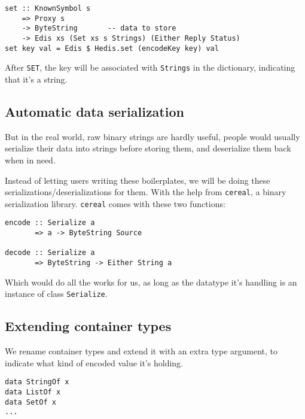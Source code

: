 \documentclass[pldi]{sigplanconf-pldi16}
\begin{document}
\begin{verbatim}
set :: KnownSymbol s
    => Proxy s
    -> ByteString       -- data to store
    -> Edis xs (Set xs s Strings) (Either Reply Status)
set key val = Edis $ Hedis.set (encodeKey key) val
\end{verbatim}

After \texttt{SET}, the key will be associated with
 \texttt{Strings} in the dictionary, indicating that it's a string.

\subsection{Automatic data serialization}
But in the real world, raw binary strings are hardly useful, people would
 usually serialize their data into strings before storing them, and deserialize
 them back when in need.

Instead of letting users writing these boilerplates, we will be doing these
 serializations/deserializations for them. With the help from
 \texttt{cereal}, a binary serialization library.
 \texttt{cereal} comes with these two functions:

\begin{verbatim}
encode :: Serialize a
       => a -> ByteString Source

decode :: Serialize a
       => ByteString -> Either String a
\end{verbatim}

Which would do all the works for us, as long as the datatype it's handling is
 an instance of class \texttt{Serialize}.\footnotemark


\subsection{Extending container types}
We rename container types and extend it with an extra type argument,
 to indicate what kind of encoded value it's holding.

\begin{verbatim}
data StringOf x
data ListOf x
data SetOf x
...
\end{verbatim}
\end{document}
